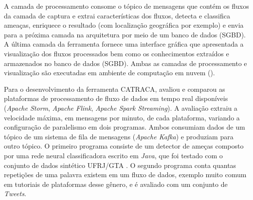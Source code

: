 A camada de processamento consome o tópico de mensagens que contém os fluxos
da camada de captura e extrai características dos fluxos, detecta e classifica ameaças,
enriquece o resultado (com localização geográfica por exemplo) e envia para a
próxima camada na arquitetura por meio de um banco de dados (SGBD).
A última camada da ferramenta fornece uma interface gráfica que apresentada a
visualização dos fluxos processados bem como os conhecimentos extraídos e
armazenados no banco de dados (SGBD).
Ambas as camadas de processamento e visualização são executadas em ambiente de
computação em nuvem (\cloud).

Para o desenvolvimento da ferramenta CATRACA,  avaliou e
comparou as plataformas de processamento de fluxo de dados em tempo real
disponíveis (\emph{Apache Storm}, \emph{Apache Flink}, \emph{Apache Spark Streaming}).
A avaliação extraiu a velocidade máxima, em mensagens por minuto,
de cada plataforma, variando a configuração de paralelismo
em dois programas.
Ambos consumiam dados de um tópico de um sistema de fila
de mensagens (\emph{Apache Kafka}) e produziam para outro tópico.
O primeiro programa consiste de um detector de ameças composto por
uma rede neural classificadora escrito em \emph{Java}, que foi testado
com o conjunto de dados sintético UFRJ/GTA \cite{Lopez2018}.
O segundo programa conta quantas repetições de uma palavra existem em um
fluxo de dados, exemplo muito comum em tutoriais de plataformas desse gênero,
e é avaliado com um conjunto de \emph{Tweets}.

% 

